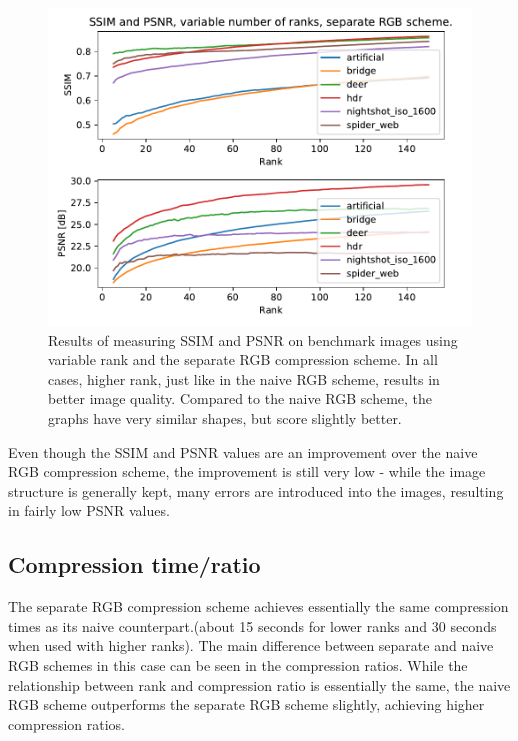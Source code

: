 \documentclass[thesis=M,english]{FITthesis}[2012/10/20]
\begin{document}
\begin{figure}[h]
  \centering
  \includegraphics[scale=0.7]{imgs/results/psnr_ssim_separate}
  \caption[SSIM and PSNR using separate RGB compression scheme]{Results of
           measuring SSIM and PSNR on benchmark images using variable rank
           and the separate RGB compression scheme. In all cases, higher
           rank, just like in the naive RGB scheme, results in better
           image quality. Compared to the naive RGB scheme, the graphs
           have very similar shapes, but score slightly better.}
  \label{fig:ssim_separate}
\end{figure}

Even though the SSIM and PSNR values are an improvement over the naive RGB compression scheme,
the improvement is still very low - while the image structure is generally kept, many
errors are introduced into the images, resulting in fairly low PSNR values.

\subsection{Compression time/ratio}
The separate RGB compression scheme achieves essentially the same compression
times as its naive counterpart.(about 15 seconds for lower ranks and 30 seconds
when used with higher ranks). The main difference between separate and naive RGB
schemes in this case can be seen in the compression ratios. While the relationship
between rank and compression ratio is essentially the same, the naive RGB scheme
outperforms the separate RGB scheme slightly, achieving higher compression ratios.
\end{document}
